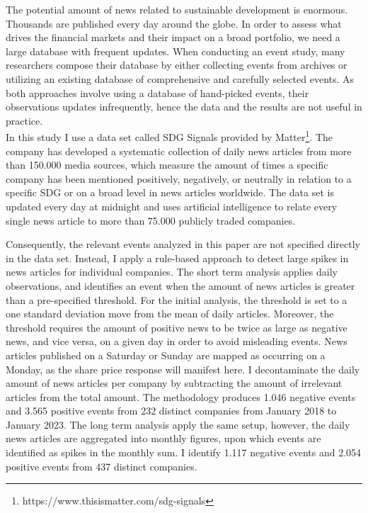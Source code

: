 The potential amount of news related to sustainable development is enormous. Thousands are published every day around the globe. In order to assess what drives the financial markets and their impact on a broad portfolio, we need a large database with frequent updates. When conducting an event study, many researchers compose their database by either collecting events from archives or utilizing an existing database of comprehensive and carefully selected events. As both approaches involve using a database of hand-picked events, their observations updates infrequently, hence the data and the results are not useful in practice. \\
In this study I use a data set called SDG Signals provided by Matter\footnote{https://www.thisismatter.com/sdg-signals}. The company has developed a systematic collection of daily news articles from more than 150.000 media sources, which measure the amount of times a specific company has been mentioned positively, negatively, or neutrally in relation to a specific SDG or on a broad level in news articles worldwide.   
The data set is updated every day at midnight and uses artificial intelligence to relate every single news article to more than 75.000 publicly traded companies. 

Consequently, the relevant events analyzed in this paper are not specified directly in the data set. Instead, I apply a rule-based approach to detect large spikes in news articles for individual companies. The short term analysis applies daily observations, and identifies an event when the amount of news articles is greater than a pre-specified threshold. For the initial analysis, the threshold is set to a one standard deviation move from the mean of daily articles. Moreover, the threshold requires the amount of positive news to be twice as large as negative news, and vice versa, on a given day in order to avoid misleading events. News articles published on a Saturday or Sunday are mapped as occurring on a Monday, as the share price response will manifest here. I decontaminate the daily amount of news articles per company by subtracting the amount of irrelevant articles from the total amount. The methodology produces 1.046 negative events and 3.565 positive events from 232 distinct companies from January 2018 to January 2023. The long term analysis apply the same setup, however, the daily news articles are aggregated into monthly figures, upon which events are identified as spikes in the monthly sum. I identify 1.117 negative events and 2.054 positive events from 437 distinct companies. 

